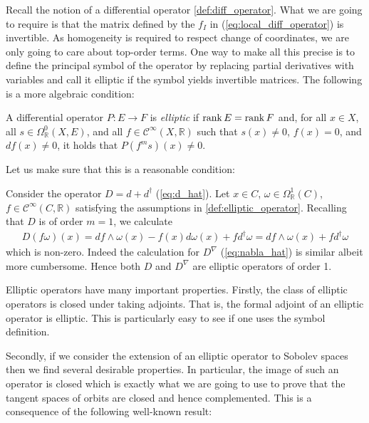 \documentclass[12pt]{ociamthesis}  %
\begin{document}
Recall the notion of a differential operator \ref{def:diff_operator}.
What we are going to require is that the matrix defined by the
$f_I$ in (\ref{eq:local_diff_operator}) is invertible.
As homogeneity is required to respect change of coordinates,
we are only going to care about top-order terms. One way to make all
this precise is to define the principal symbol of the operator by
replacing partial derivatives with variables and
call it elliptic if the symbol yields invertible matrices.
The following is a more algebraic condition:

\begin{definition}\label{def:elliptic_operator}
  A differential operator $P:E\to F$ is \emph{elliptic} if
  $\operatorname{rank} E = \operatorname{rank} F$ and, for all $x\in X$, all $s\in\Omega^0_{\mathbb R}(X,E)$,
  and all $f\in \mathscr C^\infty(X,\mathbb R)$ such that $s(x) \neq 0$,
  $f(x) = 0$, and $df(x) \neq 0$, it holds that $P(f^m s)(x) \neq 0$.
\end{definition}

Let us make sure that this is a reasonable condition:

\begin{example}
  Consider the operator $D = d + d^\dagger$ (\ref{eq:d_hat}). Let
  $x\in C$, $\omega\in\Omega^1_{\mathbb R}(C)$,
  $f\in \mathscr C^\infty(C,\mathbb R)$
  satisfying the assumptions in \ref{def:elliptic_operator}.
  Recalling that $D$ is of order $m=1$, we calculate
  \begin{align*}
    D(f\omega)(x)= df\wedge \omega(x) - f(x)d\omega(x) + fd^\dagger\omega= df\wedge\omega(x) + fd^\dagger\omega
  \end{align*}
  which is non-zero. Indeed the calculation for
  $D^\nabla$ (\ref{eq:nabla_hat}) is similar albeit more cumbersome.
  Hence both $D$ and $D^\nabla$ are elliptic operators of order 1.
\end{example}

Elliptic operators have many important properties. Firstly, the class
of elliptic operators is closed under taking adjoints. That is,
the formal adjoint of an elliptic operator is elliptic. This is particularly
easy to see if one uses the symbol definition.

Secondly, if we consider the extension of an elliptic operator
to Sobolev spaces then we find several desirable properties.
In particular, the image of such an operator is closed which is
exactly what we are going to use to prove that the tangent spaces
of orbits are closed and hence complemented. This is a consequence
of the following well-known result:
\end{document}
